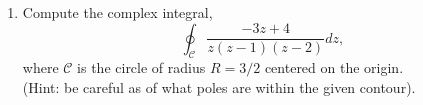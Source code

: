 \documentclass[fleqn]{article}
\begin{document}
\begin{enumerate}
    
    \item Compute the complex integral,
    $$ \oint_{\mathcal C} \frac{-3z + 4}{z(z-1)(z-2)} dz ,$$
    where ${\mathcal C}$ is the circle of radius $R=3/2$ centered on the origin. \\
    (Hint:  be careful as of what poles are within the given contour). 
    
  \end{enumerate}
\end{document}
